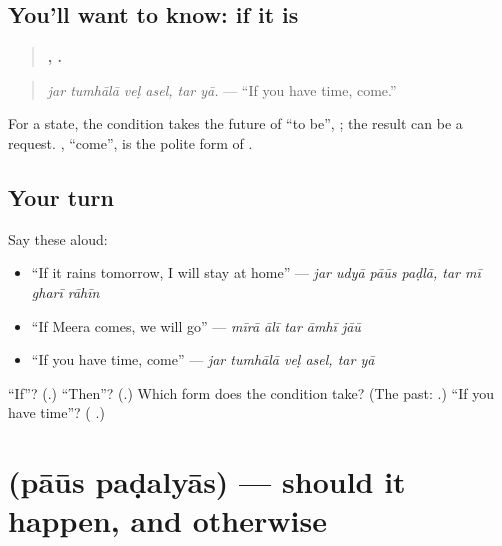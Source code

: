 \subsection*{You'll want to know: if it is}
\begin{quote}
\textbf{   ,  .}
\end{quote}

\begin{quote}
\emph{jar tumhālā veḷ asel, tar yā.} — \textquotedblleft{}If you have time, come.\textquotedblright{}
\end{quote}

For a state, the condition takes the future of \textquotedblleft{}to be\textquotedblright{}, \textbf{}; the result can be a request. \textbf{}, \textquotedblleft{}come\textquotedblright{}, is the polite form of \textbf{}.

\subsection*{Your turn}
Say these aloud:

\begin{itemize}
\raggedright
  \item \textquotedblleft{}If it rains tomorrow, I will stay at home\textquotedblright{} — \emph{jar udyā pāūs paḍlā, tar mī gharī rāhīn}
  \item \textquotedblleft{}If Meera comes, we will go\textquotedblright{} — \emph{mīrā ālī tar āmhī jāū}
  \item \textquotedblleft{}If you have time, come\textquotedblright{} — \emph{jar tumhālā veḷ asel, tar yā}
\end{itemize}

\begin{tcolorbox}[breakable,colback=teal!4,colframe=teal!35!black,title={Before you move on}]
\textquotedblleft{}If\textquotedblright{}? (\textbf{}.) \textquotedblleft{}Then\textquotedblright{}? (\textbf{}.) Which form does the condition take? (The past: \textbf{}.) \textquotedblleft{}If you have time\textquotedblright{}? (\textbf{   }.)
\end{tcolorbox}
\section[\texorpdfstring{\mr{पाऊस} \mr{पडल्यास} (pāūs paḍalyās)}{पाऊस पडल्यास (pāūs paḍalyās)}]{  (pāūs paḍalyās) — should it happen, and otherwise}

